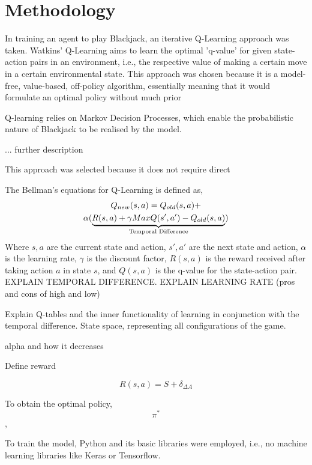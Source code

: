 \section{Methodology}

In training an agent to play Blackjack, an iterative Q-Learning approach was taken. Watkins' Q-Learning aims to learn the optimal 'q-value' for given state-action pairs in an environment, i.e., the respective value of making a certain move in a certain environmental state. This approach was chosen because it is a model-free, value-based, off-policy algorithm, essentially meaning that it would formulate an optimal policy without much prior 

Q-learning relies on Markov Decision Processes, which enable the probabilistic nature of Blackjack to be realised by the model. 

... further description

This approach was selected because it does not require direct 


The Bellman's equations for Q-Learning is defined as,
\begin{multline}
    Q_{new}(s,a)=Q_{old}(s,a)+\\\alpha(\underbrace{R(s,a)+\gamma MaxQ(s',a')-Q_{old}(s,a)}_{\mathclap{\text{Temporal Difference}}})
\end{multline}
Where \( s, a \) are the current state and action,  \( s', a' \) are the next state and action, \( \alpha \) is the learning rate, \( \gamma \) is the discount factor, \( R(s,a) \) is the reward received after taking action \( a \) in state \( s \), and \( Q(s,a) \) is the q-value for the state-action pair. EXPLAIN TEMPORAL DIFFERENCE. EXPLAIN LEARNING RATE (pros and cons of high and low)


Explain Q-tables and the inner functionality of learning in conjunction with the temporal difference. State space, representing all configurations of the game. 

alpha and how it decreases

Define reward

\begin{equation} \label{reward}
    R(s,a) = S + \delta_{\Delta A}
\end{equation}
    
To obtain the optimal policy, \[\pi^*\], 

To train the model, Python and its basic libraries were employed, i.e., no machine learning libraries like Keras or Tensorflow. 



